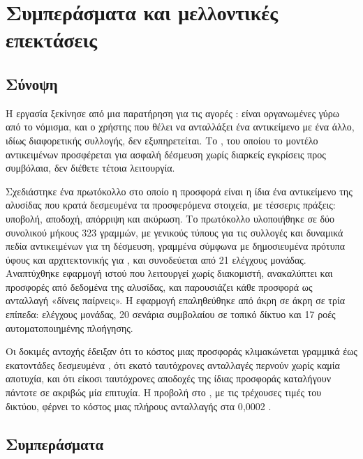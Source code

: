 \chapter{Συμπεράσματα και μελλοντικές επεκτάσεις}
\label{ch:symperasmata}

\section{Σύνοψη}
\label{sec:synopsi}

Η εργασία ξεκίνησε από μια παρατήρηση για τις αγορές : είναι οργανωμένες γύρω από
το νόμισμα, και ο χρήστης που θέλει να ανταλλάξει ένα αντικείμενο με ένα άλλο, ιδίως
διαφορετικής συλλογής, δεν εξυπηρετείται. Το , του οποίου το μοντέλο αντικειμένων
προσφέρεται για ασφαλή δέσμευση χωρίς διαρκείς εγκρίσεις προς συμβόλαια, δεν διέθετε
τέτοια λειτουργία.

Σχεδιάστηκε ένα πρωτόκολλο στο οποίο η προσφορά είναι η ίδια ένα αντικείμενο της αλυσίδας
που κρατά δεσμευμένα τα προσφερόμενα στοιχεία, με τέσσερις πράξεις: υποβολή, αποδοχή,
απόρριψη και ακύρωση. Το πρωτόκολλο υλοποιήθηκε σε δύο   συνολικού
μήκους 323 γραμμών, με γενικούς τύπους για τις συλλογές και δυναμικά πεδία αντικειμένων
για τη δέσμευση, γραμμένα σύμφωνα με δημοσιευμένα πρότυπα ύφους και αρχιτεκτονικής για
, και συνοδεύεται από 21 ελέγχους μονάδας. Αναπτύχθηκε εφαρμογή ιστού που
λειτουργεί χωρίς διακομιστή, ανακαλύπτει  και προσφορές από δεδομένα της
αλυσίδας, και παρουσιάζει κάθε προσφορά ως ανταλλαγή «δίνεις \swap{} παίρνεις». Η εφαρμογή
επαληθεύθηκε από άκρη σε άκρη σε τρία επίπεδα: ελέγχους μονάδας, 20 σενάρια συμβολαίου σε τοπικό
δίκτυο και 17 ροές αυτοματοποιημένης πλοήγησης.

Οι δοκιμές αντοχής έδειξαν ότι το κόστος μιας προσφοράς κλιμακώνεται γραμμικά έως
εκατοντάδες δεσμευμένα , ότι εκατό ταυτόχρονες ανταλλαγές περνούν χωρίς καμία
αποτυχία, και ότι είκοσι ταυτόχρονες αποδοχές της ίδιας προσφοράς καταλήγουν πάντοτε σε
ακριβώς μία επιτυχία. Η προβολή στο , με τις τρέχουσες τιμές του δικτύου,
φέρνει το κόστος μιας πλήρους ανταλλαγής στα 0{,}0002 .

\section{Συμπεράσματα}
\label{sec:conclusions}

